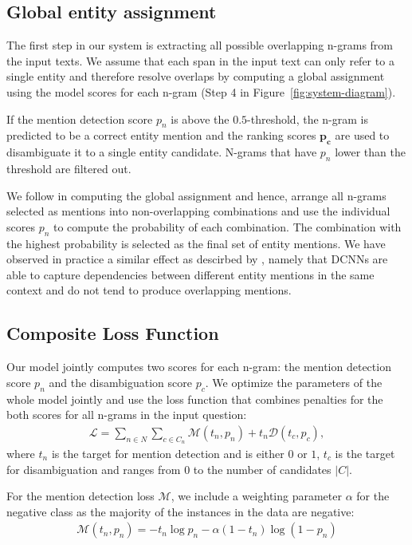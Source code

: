 \documentclass[11pt,a4paper]{article}
\begin{document}
\subsection{Global entity assignment}

The first step in our system is extracting all possible overlapping n-grams from the input texts. We assume that each span in the input text can only refer to a single entity and therefore resolve overlaps by computing a global assignment using the model scores for each n-gram (Step 4 in Figure~\ref{fig:system-diagram}). 

If the mention detection score $p_n$ is above the $0.5$-threshold, the n-gram is predicted to be a correct entity mention and the ranking scores $\mathbf{p_c}$ are used to disambiguate it to a single entity candidate. N-grams that have $p_n$ lower than the threshold are filtered out.

We follow \citet{Guo2013b} in computing the global assignment and hence, arrange all n-grams selected as mentions into non-overlapping combinations and use the individual scores $p_n$ to compute the probability of each combination. The combination with the highest probability is selected as the final set of entity mentions. We have observed in practice a similar effect as descirbed by \citet{Strubell2017}, namely that DCNNs are able to capture dependencies between different entity mentions in the same context and do not tend to produce overlapping mentions.


\subsection{Composite Loss Function}
\label{sec:loss}

Our model jointly computes two scores for each n-gram: the mention detection score $p_n$ and the disambiguation score $p_c$. We optimize the parameters of the whole model jointly and use the loss function that combines penalties for the both scores for all n-grams in the input question:
\begin{multline*}
\mathcal{L} = \sum_{n\in N}\sum_{c\in C_n}\mathcal{M}(t_n, p_n)	+ t_n\mathcal{D}(t_c, p_c),
\end{multline*}
where $t_n$ is the target for mention detection and is either $0$ or $1$, $t_c$ is the target for disambiguation and ranges from $0$ to the number of candidates $|C|$. 

For the mention detection loss $\mathcal{M}$, we include a weighting parameter $\alpha$ for the negative class as the majority of the instances in the data are negative:
\begin{multline*}
\mathcal{M}(t_n,p_n) = - t_n\log p_n - \alpha(1-t_n)\log(1-p_n)
\end{multline*}
\end{document}
